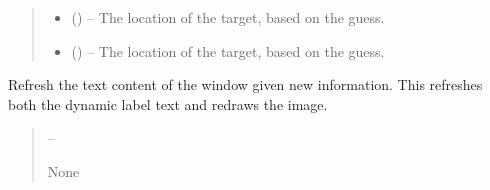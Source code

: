 \documentclass[letterpaper,11pt,english]{sphinxmanual}
\begin{document}
\begin{savenotes}
\begin{fulllineitems}
\begin{savenotes}
\begin{fulllineitems}
\begin{quote}
\begin{description}
\sphinxAtStartPar
\begin{itemize}
\item {} 
\sphinxAtStartPar
{} () – The location of the target, based on the guess.

\item {} 
\sphinxAtStartPar
{} () – The location of the target, based on the guess.

\end{itemize}


\end{description}\end{quote}

\end{fulllineitems}\end{savenotes}


\begin{savenotes}\begin{fulllineitems}
\label{\detokenize{code/opihiexarata.gui.selector:opihiexarata.gui.selector.TargetSelectorWindow.refresh_window}}
\pysigstartsignatures
{}
\pysigstopsignatures
\sphinxAtStartPar
Refresh the text content of the window given new information.
This refreshes both the dynamic label text and redraws the image.
\begin{quote}\begin{description}
\sphinxAtStartPar
{} – 

\sphinxAtStartPar
None

\end{description}\end{quote}

\end{fulllineitems}\end{savenotes}


\begin{savenotes}\begin{fulllineitems}
\label{\detokenize{code/opihiexarata.gui.selector:opihiexarata.gui.selector.TargetSelectorWindow.staticMetaObject}}
\pysigstartsignatures
{}
\pysigstopsignatures
\end{fulllineitems}\end{savenotes}



\end{fulllineitems}
\end{savenotes}
\end{document}
